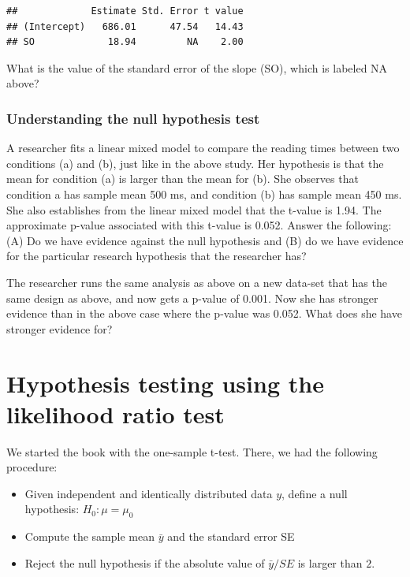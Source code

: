 \documentclass[12pt,]{krantz}
\providecommand{\tightlist}{%
  \setlength{\itemsep}{0pt}\setlength{\parskip}{0pt}}
\begin{document}
\begin{verbatim}
##             Estimate Std. Error t value
## (Intercept)   686.01      47.54   14.43
## SO             18.94         NA    2.00
\end{verbatim}

What is the value of the standard error of the slope (SO), which is labeled NA above?

\hypertarget{sec:LMExercisesPart8}{%
\subsection{Understanding the null hypothesis test}\label{sec:LMExercisesPart8}}

A researcher fits a linear mixed model to compare the reading times between two conditions (a) and (b), just like in the above study. Her hypothesis is that the mean for condition (a) is larger than the mean for (b). She observes that condition a has sample mean 500 ms, and condition (b) has sample mean 450 ms. She also establishes from the linear mixed model that the t-value is 1.94. The approximate p-value associated with this t-value is 0.052. Answer the following: (A) Do we have evidence against the null hypothesis and (B) do we have evidence for the particular research hypothesis that the researcher has?

The researcher runs the same analysis as above on a new data-set that has the same design as above, and now gets a p-value of 0.001. Now she has stronger evidence than in the above case where the p-value was 0.052. What does she have stronger evidence for?

\hypertarget{hypothesis-testing-using-the-likelihood-ratio-test}{%
\chapter{Hypothesis testing using the likelihood ratio test}\label{hypothesis-testing-using-the-likelihood-ratio-test}}

We started the book with the one-sample t-test. There, we had the following procedure:

\begin{itemize}
\tightlist
\item
  Given independent and identically distributed data \(y\), define a null hypothesis: \(H_0: \mu=\mu_0\)
\item
  Compute the sample mean \(\bar{y}\) and the standard error SE
\item
  Reject the null hypothesis if the absolute value of \(\bar{y}/SE\) is larger than \(2\).
\end{itemize}
\end{document}

